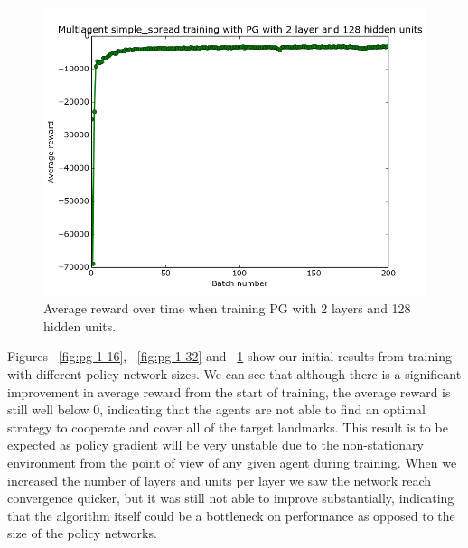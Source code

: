 \documentclass{article}
\begin{document}
\begin{figure}
\begin{center}
    \includegraphics[scale=0.25]{pg_2_128_gamma1}
    \caption{Average reward over time when training PG with 2 layers and 128 hidden units.}
\end{center}
\label{fig:pg-2-128}
\end{figure}

Figures ~\ref{fig:pg-1-16}, ~\ref{fig:pg-1-32}  and ~\ref{fig:pg-2-128} show our initial results from training with different policy network sizes. We can see that although there is a significant improvement in average reward from the start of training, the average reward is still well below 0, indicating that the agents are not able to find an optimal strategy to cooperate and cover all of the target landmarks. This result is to be expected as policy gradient will be very unstable due to the non-stationary environment from the point of view of any given agent during training. When we increased the number of layers and units per layer we saw the network reach convergence quicker, but it was still not able to improve substantially, indicating that the algorithm itself could be a bottleneck on performance as opposed to the size of the policy networks.



\end{document}
